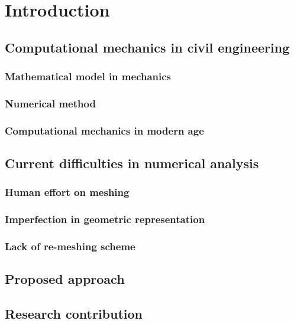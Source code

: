 
\chapter{Introduction}

\section{Computational mechanics in civil engineering}

    \subsection{Mathematical model in mechanics}

    \subsection{Numerical method}

    \subsection{Computational mechanics in modern age}

\section{Current difficulties in numerical analysis}

    \subsection{Human effort on meshing}

    \subsection{Imperfection in geometric representation}

    \subsection{Lack of re-meshing scheme}

\section{Proposed approach}

\section{Research contribution}
    
